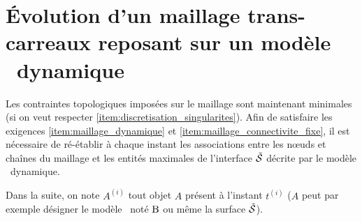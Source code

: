 

\section{Évolution d'un maillage trans-carreaux reposant sur un modèle \brep\ dynamique}
Les contraintes topologiques imposées sur le maillage sont maintenant minimales (si on veut respecter \ref{item:discretisation_singularites}). 
Afin de satisfaire les exigences \ref{item:maillage_dynamique} et \ref{item:maillage_connectivite_fixe}, il est nécessaire de ré-établir à chaque instant les associations entre les n\oe uds et chaînes du maillage et les entités maximales de l'interface $\tilde{\mathcal{S}}$ décrite par le modèle \brep\ dynamique.

\par\bigskip
\newcommand{\instant}[2]{#1^{(#2)}}
Dans la suite, on note $\instant{A}{i}$ tout objet $A$ présent à l'instant $\instant{t}{i}$ ($A$ peut par exemple désigner le modèle \brep\ noté $\mathrm{B}$ ou même la surface $\tilde{\mathcal{S}}$).\par

